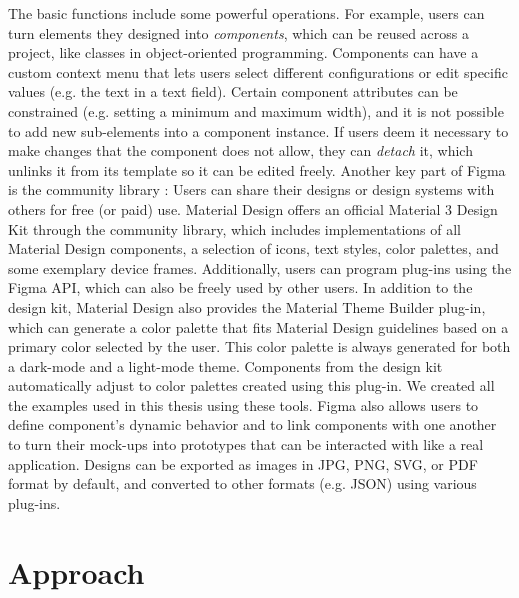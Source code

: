 \documentclass[11pt,titlepage,oneside,openany]{book}
\begin{document}
The basic functions include some powerful operations. For example, users can turn elements they designed into \emph{components}, which can be reused across a project, like classes in object-oriented programming. Components can have a custom context menu that lets users select different configurations or edit specific values (e.g. the text in a text field). Certain component attributes can be constrained (e.g. setting a minimum and maximum width), and it is not possible to add new sub-elements into a component instance. If users deem it necessary to make changes that the component does not allow, they can \emph{detach} it, which unlinks it from its template so it can be edited freely. Another key part of Figma is the community library \cite{noauthor_figma_nodate-1}: Users can share their designs or design systems with others for free (or paid) use. Material Design offers an official Material 3 Design Kit \cite{noauthor_material_nodate-1} through the community library, which includes implementations of all Material Design components, a selection of icons, text styles, color palettes, and some exemplary device frames. Additionally, users can program plug-ins using the Figma API, which can also be freely used by other users. In addition to the design kit, Material Design also provides the Material Theme Builder \cite{noauthor_material_nodate-2} plug-in, which can generate a color palette that fits Material Design guidelines based on a primary color selected by the user. This color palette is always generated for both a dark-mode and a light-mode theme. Components from the design kit automatically adjust to color palettes created using this plug-in. We created all the examples used in this thesis using these tools. Figma also allows users to define component's dynamic behavior and to link components with one another to turn their mock-ups into prototypes that can be interacted with like a real application. Designs can be exported as images in JPG, PNG, SVG, or PDF format by default, and converted to other formats (e.g. JSON) using various plug-ins. 

\chapter{Approach}
\end{document}

